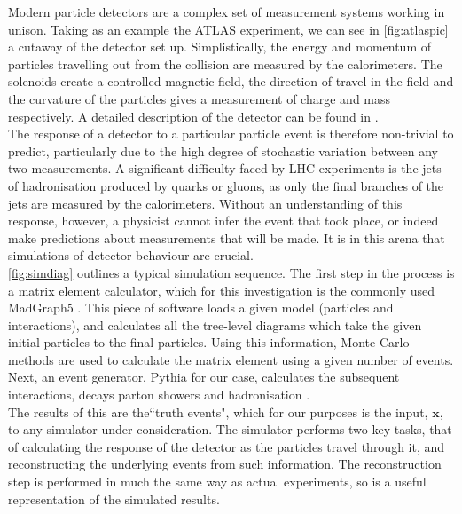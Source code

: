\documentclass{article}
\begin{document}
Modern particle detectors are a complex set of measurement systems working in unison. Taking as an example the ATLAS experiment, we can see in \cref{fig:atlaspic} a cutaway of the detector set up. Simplistically, the energy and momentum of particles travelling out from the collision are measured by the calorimeters. The solenoids create a controlled magnetic field, the direction of travel in the field and the curvature of the particles gives a measurement of charge and mass respectively. A detailed description of the detector can be found in \cite{armstrong}.
\\


The response of a detector to a particular particle event is therefore non-trivial to predict, particularly due to the high degree of stochastic variation between any two measurements. A significant difficulty faced by LHC experiments is the jets of hadronisation produced by quarks or gluons, as only the final branches of the jets are measured by the calorimeters. Without an understanding of this response, however, a physicist cannot infer the event that took place, or indeed make predictions about measurements that will be made. It is in this arena that simulations of detector behaviour are crucial. \\

\cref{fig:simdiag} outlines a typical simulation sequence. The first step in the process is a matrix element calculator, which for this investigation is the commonly used MadGraph5 \cite{madgraph}. This piece of software loads a given model (particles and interactions), and calculates all the tree-level diagrams which take the given initial particles to the final particles. Using this information, Monte-Carlo methods are used to calculate the matrix element using a given number of events. Next, an event generator, Pythia for our case, calculates the subsequent interactions, decays parton showers and hadronisation \cite{Gieseke2012}.\\

The results of this are the``truth events", which for our purposes is the input, $\mathbf{x}$, to any simulator under consideration. The simulator performs two key tasks, that of calculating the response of the detector as the particles travel through it, and reconstructing the underlying events from such information. The reconstruction step is performed in much the same way as actual experiments, so is a useful representation of the simulated results.        
\end{document}
